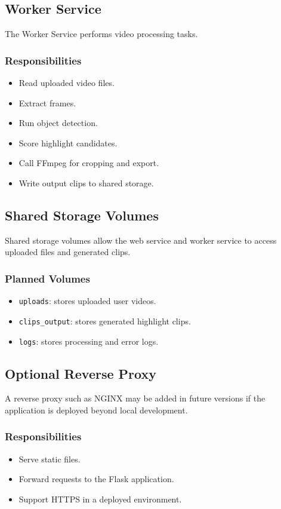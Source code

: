 \documentclass[12pt]{article}
\begin{document}
\subsection{Worker Service}
The Worker Service performs video processing tasks.

\subsubsection*{Responsibilities}
\begin{itemize}[noitemsep]
    \item Read uploaded video files.
    \item Extract frames.
    \item Run object detection.
    \item Score highlight candidates.
    \item Call FFmpeg for cropping and export.
    \item Write output clips to shared storage.
\end{itemize}

\subsection{Shared Storage Volumes}
Shared storage volumes allow the web service and worker service to access uploaded files and generated clips.

\subsubsection*{Planned Volumes}
\begin{itemize}[noitemsep]
    \item \texttt{uploads}: stores uploaded user videos.
    \item \texttt{clips\_output}: stores generated highlight clips.
    \item \texttt{logs}: stores processing and error logs.
\end{itemize}

\subsection{Optional Reverse Proxy}
A reverse proxy such as NGINX may be added in future versions if the application is deployed beyond local development.

\subsubsection*{Responsibilities}
\begin{itemize}[noitemsep]
    \item Serve static files.
    \item Forward requests to the Flask application.
    \item Support HTTPS in a deployed environment.
\end{itemize}
\end{document}
